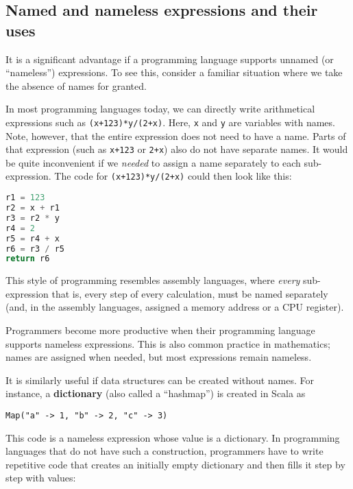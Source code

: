 \subsection{Named and nameless expressions and their uses}

It is a significant advantage if a programming language supports unnamed
(or ``nameless'') expressions. To see this, consider a familiar
situation where we take the absence of names for granted.

In most programming languages today, we can directly write arithmetical
expressions such as \texttt{}\lstinline!(x+123)*y/(2+x)!. Here,
\texttt{}\lstinline!x! and \texttt{}\lstinline!y! are variables
with names. Note, however, that the entire expression does not need
to have a name. Parts of that expression (such as \texttt{}\lstinline!x+123!
or \lstinline!2+x!) also do not have separate names. It would be
quite inconvenient if we \emph{needed} to assign a name separately
to each sub-expression. The code for \lstinline!(x+123)*y/(2+x)!
could then look like this:

\begin{lstlisting}[language=Python]
r1 = 123
r2 = x + r1
r3 = r2 * y
r4 = 2
r5 = r4 + x
r6 = r3 / r5
return r6
\end{lstlisting}

This style of programming resembles assembly languages,
where \emph{every} sub-expression \textendash{} that is, every step
of every calculation, \textendash{} must be named separately (and,
in the assembly languages, assigned a memory address or a CPU register).

Programmers become more productive when their programming language
supports nameless expressions. This is also common practice in mathematics;
names are assigned when needed, but most expressions remain nameless.

It is similarly useful if data structures can be created without names.
For instance, a \textbf{dictionary} (also called
a ``hashmap'') is created in Scala as
\begin{lstlisting}
Map("a" -> 1, "b" -> 2, "c" -> 3)
\end{lstlisting}
This code is a nameless expression whose value is a dictionary. In
programming languages that do not have such a construction, programmers
have to write repetitive code that creates an initially empty dictionary
and then fills it step by step with values:

